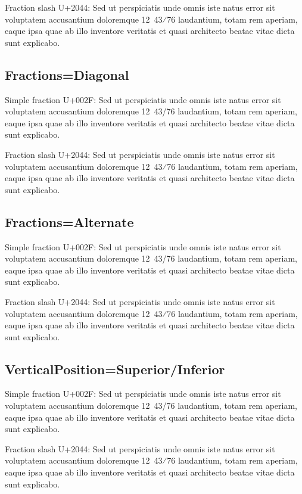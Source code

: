 \documentclass[12pt,twoside,a4paper]{book}
\begin{document}
Fraction slash U+2044: Sed ut perspiciatis unde omnis iste natus error sit voluptatem accusantium doloremque 12~43⁄76 laudantium, totam rem aperiam, eaque ipsa quae ab illo inventore veritatis et quasi architecto beatae vitae dicta sunt explicabo.

\subsection{Fractions=Diagonal}

Simple fraction U+002F: Sed ut perspiciatis unde omnis iste natus error sit voluptatem accusantium doloremque 12~43/76 laudantium, totam rem aperiam, eaque ipsa quae ab illo inventore veritatis et quasi architecto beatae vitae dicta sunt explicabo.

Fraction slash U+2044: Sed ut perspiciatis unde omnis iste natus error sit voluptatem accusantium doloremque 12~43⁄76 laudantium, totam rem aperiam, eaque ipsa quae ab illo inventore veritatis et quasi architecto beatae vitae dicta sunt explicabo.

\subsection{Fractions=Alternate}

Simple fraction U+002F: Sed ut perspiciatis unde omnis iste natus error sit voluptatem accusantium doloremque 12~43/76 laudantium, totam rem aperiam, eaque ipsa quae ab illo inventore veritatis et quasi architecto beatae vitae dicta sunt explicabo.

Fraction slash U+2044: Sed ut perspiciatis unde omnis iste natus error sit voluptatem accusantium doloremque 12~43⁄76 laudantium, totam rem aperiam, eaque ipsa quae ab illo inventore veritatis et quasi architecto beatae vitae dicta sunt explicabo.

\subsection{VerticalPosition=Superior/Inferior}


Simple fraction U+002F: Sed ut perspiciatis unde omnis iste natus error sit voluptatem accusantium doloremque {12~43/76} laudantium, totam rem aperiam, eaque ipsa quae ab illo inventore veritatis et quasi architecto beatae vitae dicta sunt explicabo.

Fraction slash U+2044: Sed ut perspiciatis unde omnis iste natus error sit voluptatem accusantium doloremque {12~43⁄76} laudantium, totam rem aperiam, eaque ipsa quae ab illo inventore veritatis et quasi architecto beatae vitae dicta sunt explicabo.
\end{document}

